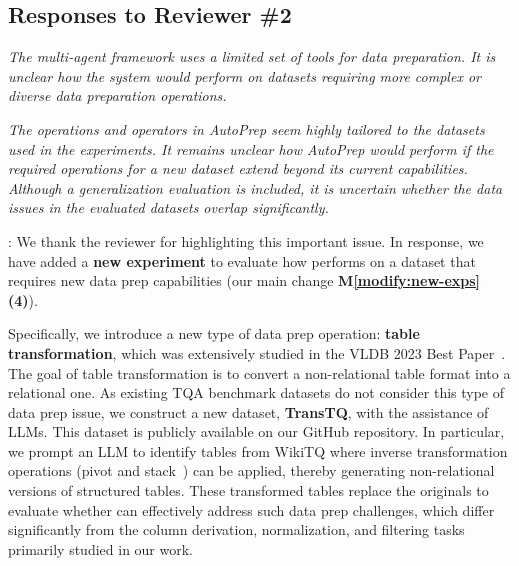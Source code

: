 \subsection*{Responses to Reviewer \#2}
\label{cover_letter:r2}

\begin{shaded}
{

\emph{The multi-agent framework uses a limited set of tools for data preparation. It is unclear how the system would perform on datasets requiring more complex or diverse data preparation operations.}

\emph{The operations and operators in AutoPrep seem highly tailored to the datasets used in the experiments. It remains unclear how AutoPrep would perform if the required operations for a new dataset extend beyond its current capabilities. Although a generalization evaluation is included, it is uncertain whether the data issues in the evaluated datasets overlap significantly.}

}
\end{shaded}

: 
We thank the reviewer for highlighting this important issue.
In response, we have added a \textbf{new experiment} to evaluate how \sys performs on a dataset that requires new data prep capabilities (our main change \textbf{M\ref{modify:new-exps} (4)}). 

Specifically, we introduce a new type of data prep operation: \textbf{table transformation}, which was extensively studied in the VLDB 2023 Best Paper~\cite{li2023auto}. The goal of table transformation is to convert a non-relational table format into a relational one. As existing TQA benchmark datasets do not consider this type of data prep issue, we construct a new dataset, \textbf{TransTQ}, with the assistance of LLMs. This dataset is publicly available on our GitHub repository. In particular, we prompt an LLM to identify tables from WikiTQ where inverse transformation operations (\eg pivot and stack~\cite{li2023auto}) can be applied, thereby generating non-relational versions of structured tables. These transformed tables replace the originals to evaluate whether \sys can effectively address such data prep challenges, which differ significantly from the column derivation, normalization, and filtering tasks primarily studied in our work.


